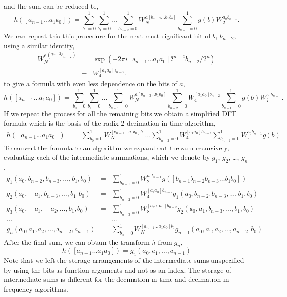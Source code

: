 \documentclass[fleqn,12pt]{article}
\begin{document}
and the sum can be reduced to,
%
\begin{equation}
h([a_{n-1} \dots a_1 a_0])
= 
\sum_{b_0=0}^{1} 
\sum_{b_1=0}^{1} 
\dots
\sum_{b_{n-2}=0}^{1} 
W_N^{a[b_{n-2} \dots b_1 b_0]}
\sum_{b_{n-1}=0}^{1} 
 g(b) 
W_2^{a_0 b_{n-1}}.
\end{equation}
%
We can repeat this this procedure for the next most significant bit of
$b$, $b_{n-2}$, using a similar identity,
%
\begin{eqnarray}
W_N^{a(2^{n-2}b_{n-2})} 
&=& \exp(-2\pi i [a_{n-1} \dots a_1 a_0] 2^{n-2} b_{n-2}/ 2^n )\\
&=& W_4^{ [a_1 a_0] b_{n-2}}.
\end{eqnarray}
%
to give a formula with even less dependence on the bits of $a$, 
%
\begin{equation}
h([a_{n-1} \dots a_1 a_0])
= 
\sum_{b_0=0}^{1} 
\sum_{b_1=0}^{1} 
\dots
\sum_{b_{n-3}=0}^{1} 
W_N^{a[b_{n-3} \dots b_1 b_0]}
\sum_{b_{n-2}=0}^{1} 
W_4^{[a_1 a_0] b_{n-2}}
\sum_{b_{n-1}=0}^{1} 
 g(b) 
W_2^{a_0 b_{n-1}}.
\end{equation}
%
If we repeat the process for all the remaining bits we obtain a
simplified DFT formula which is the basis of the radix-2
decimation-in-time algorithm,
%
\begin{eqnarray}
h([a_{n-1} \dots a_1 a_0]) &=& 
\sum_{b_0=0}^{1} 
W_{N}^{[a_{n-1} \dots a_1 a_0]b_0} 
\dots
\sum_{b_{n-2}=0}^{1} 
W_4^{ [a_1 a_0] b_{n-2}}
\sum_{b_{n-1}=0}^{1} 
W_2^{a_0 b_{n-1}}
g(b)
\end{eqnarray}
%
To convert the formula to an algorithm we expand out the sum
recursively, evaluating each of the intermediate summations, which we
denote by $g_1$, $g_2$, \dots, $g_n$,
%
\begin{eqnarray}
g_1(a_0,  b_{n-2}, b_{n-3}, \dots, b_1, b_0) 
&=& 
\sum_{b_{n-1}=0}^{1} 
W_2^{a_0 b_{n-1}}
g([b_{n-1}  b_{n-2}  b_{n-3}  \dots  b_1  b_0]) \\
g_2(a_0, {}_{\phantom{-2}} a_{1}, b_{n-3}, \dots, b_1, b_0) 
&=& 
\sum_{b_{n-2}=0}^{1} 
W_4^{[a_1 a_0] b_{n-2}}
g_1(a_0, b_{n-2}, b_{n-3}, \dots, b_1, b_0) \\
g_3(a_0, {}_{\phantom{-2}} a_{1}, {}_{\phantom{-3}} a_{2}, \dots, b_1, b_0) 
&=& 
\sum_{b_{n-3}=0}^{1} 
W_8^{[a_2 a_1 a_0] b_{n-2}}
g_2(a_0, a_1, b_{n-3}, \dots, b_1, b_0) \\
\dots &=& \dots \\
g_n(a_0, a_{1}, a_{2}, \dots, a_{n-2}, a_{n-1}) 
&=&
\sum_{b_{0}=0}^{1} 
W_N^{[a_{n-1} \dots a_1 a_0]b_0}
g_{n-1}(a_0, a_1, a_2, \dots, a_{n-2}, b_0) 
\end{eqnarray}
%
After the final sum, we can obtain the transform $h$ from $g_n$,
%
\begin{equation}
h([a_{n-1} \dots a_1 a_0]) 
= 
g_n(a_0, a_1, \dots, a_{n-1}) 
\end{equation}
% 
Note that we left the storage arrangements of the intermediate sums
unspecified by using the bits as function arguments and not as an
index. The storage of intermediate sums is different for the
decimation-in-time and decimation-in-frequency algorithms.
\end{document}
